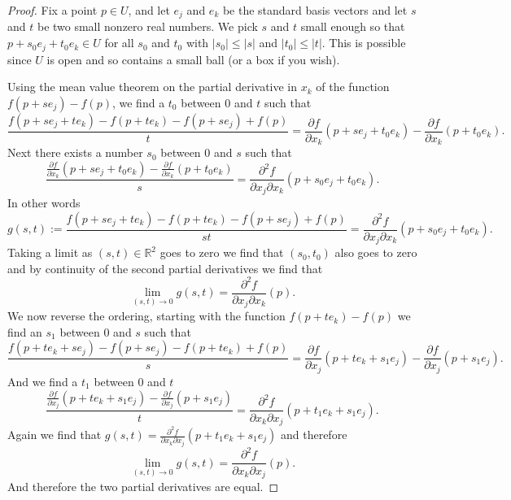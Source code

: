 \documentclass[12pt]{book}
\newcommand{\abs}[1]{\left\lvert {#1} \right\rvert}
\newcommand{\R}{{\mathbb{R}}}
\theoremstyle{plain}
\theoremstyle{remark}
\theoremstyle{definition}
\theoremstyle{exercise}
\theoremstyle{example}
\begin{document}
\begin{proof}
Fix a point $p \in U$, and let $e_j$ and $e_k$ be the standard basis
vectors and let $s$ and $t$ be two small nonzero real numbers.  We pick $s$
and $t$ small enough so that
$p+s_0e_j +t_0e_k \in U$ for all $s_0$ and $t_0$ with
$\abs{s_0} \leq \abs{s}$ and
$\abs{t_0} \leq \abs{t}$.  This is possible since $U$ is open and so
contains a small ball (or a box if you wish).

Using the mean value theorem on the partial derivative in $x_k$ of the
function $f(p+se_j)-f(p)$,
we find a $t_0$ between $0$ and $t$ such that
\begin{equation*}
\frac{f(p+se_j + te_k)- f(p+t e_k) - f(p+s e_j)+f(p)}{t}
=
\frac{\partial f}{\partial x_k}(p + s e_j + t_0 e_k)
-
\frac{\partial f}{\partial x_k}(p + t_0 e_k) .
\end{equation*}
Next there exists a number $s_0$ between $0$ and $s$ such that
\begin{equation*}
\frac{\frac{\partial f}{\partial x_k}(p + s e_j + t_0 e_k)
-
\frac{\partial f}{\partial x_k}(p + t_0 e_k)}{s}
=
\frac{\partial^2 f}{\partial x_j \partial x_k}(p + s_0 e_j + t_0 e_k) .
\end{equation*}
In other words
\begin{equation*}
g(s,t) :=
\frac{f(p+se_j + te_k)- f(p+t e_k) - f(p+s e_j)+f(p)}{st}
=
\frac{\partial^2 f}{\partial x_j \partial x_k}(p + s_0 e_j + t_0 e_k) .
\end{equation*}
Taking a limit as $(s,t) \in \R^2$ goes to zero we find that $(s_0,t_0)$
also goes to zero and by continuity of the second partial derivatives we
find that
\begin{equation*}
\lim_{(s,t) \to 0} g(s,t) = 
\frac{\partial^2 f}{\partial x_j \partial x_k}(p) .
\end{equation*}
We now reverse the ordering, starting with
the function $f(p+te_k)-f(p)$ we find an $s_1$ between $0$ and $s$ such that
\begin{equation*}
\frac{f(p+te_k + se_j)- f(p+s e_j) - f(p+t e_k)+f(p)}{s}
=
\frac{\partial f}{\partial x_j}(p + t e_k + s_1 e_j)
-
\frac{\partial f}{\partial x_j}(p + s_1 e_j) .
\end{equation*}
And we find a $t_1$ between $0$ and $t$
\begin{equation*}
\frac{\frac{\partial f}{\partial x_j}(p + t e_k + s_1 e_j)
-
\frac{\partial f}{\partial x_j}(p + s_1 e_j)}{t}
=
\frac{\partial^2 f}{\partial x_k \partial x_j}(p + t_1 e_k + s_1 e_j) .
\end{equation*}
Again we find that $g(s,t) = \frac{\partial^2 f}{\partial x_k \partial
x_j}(p + t_1 e_k + s_1 e_j)$ and therefore
\begin{equation*}
\lim_{(s,t) \to 0} g(s,t) = 
\frac{\partial^2 f}{\partial x_k \partial x_j}(p) .
\end{equation*}
And therefore the two partial derivatives are equal.
\end{proof}
\end{document}

